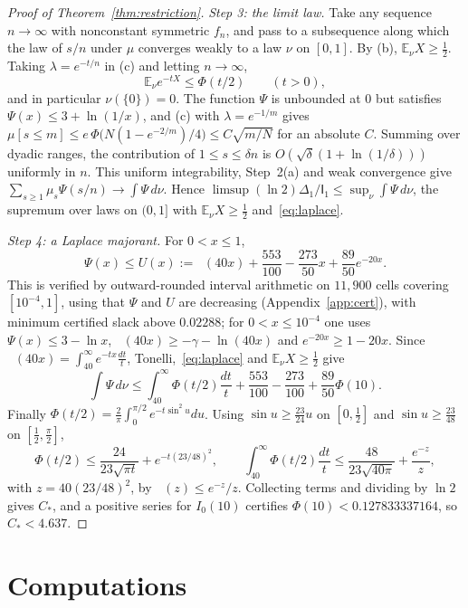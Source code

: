 \documentclass[11pt]{amsart}
\theoremstyle{definition}
\theoremstyle{remark}
\newcommand{\E}{\mathbb E}
\newcommand{\I}{\mathsf I}
\DeclareMathOperator{\Ei}{E_1}
\begin{document}
\begin{proof}[Proof of Theorem~\ref{thm:restriction}]
\emph{Step 3: the limit law.} Take any sequence $n\to\infty$ with nonconstant symmetric $f_n$, and pass to a subsequence along which the law of $s/n$ under $\mu$ converges weakly to a law $\nu$ on $[0,1]$. By (b), $\E_\nu X\ge\frac12$. Taking $\lambda=e^{-t/n}$ in (c) and letting $n\to\infty$,
\begin{equation}\label{eq:laplace}
 \E_\nu e^{-tX}\le\Phi(t/2)\qquad(t>0),
\end{equation}
and in particular $\nu(\{0\})=0$. The function $\Psi$ is unbounded at $0$ but satisfies $\Psi(x)\le3+\ln(1/x)$, and (c) with $\lambda=e^{-1/m}$ gives $\mu[s\le m]\le e\,\Phi\bigl(N(1-e^{-2/m})/4\bigr)\le C\sqrt{m/N}$ for an absolute $C$. Summing over dyadic ranges, the contribution of $1\le s\le\delta n$ is $O(\sqrt\delta(1+\ln(1/\delta)))$ uniformly in $n$. This uniform integrability, Step~2(a) and weak convergence give $\sum_{s\ge1}\mu_s\Psi(s/n)\to\int\Psi\,d\nu$. Hence $\limsup(\ln2)\Delta_1/\I_1\le\sup_\nu\int\Psi\,d\nu$, the supremum over laws on $(0,1]$ with $\E_\nu X\ge\frac12$ and~\eqref{eq:laplace}.

\emph{Step 4: a Laplace majorant.} For $0<x\le1$,
\begin{equation}\label{eq:majorant}
 \Psi(x)\le U(x):=\Ei(40x)+\frac{553}{100}-\frac{273}{50}x+\frac{89}{50}e^{-20x}.
\end{equation}
This is verified by outward-rounded interval arithmetic on $11{,}900$ cells covering $[10^{-4},1]$, using that $\Psi$ and $U$ are decreasing (Appendix~\ref{app:cert}), with minimum certified slack above $0.02288$; for $0<x\le10^{-4}$ one uses $\Psi(x)\le3-\ln x$, $\Ei(40x)\ge-\gamma-\ln(40x)$ and $e^{-20x}\ge1-20x$. Since $\Ei(40x)=\int_{40}^\infty e^{-tx}\frac{dt}t$, Tonelli,~\eqref{eq:laplace} and $\E_\nu X\ge\frac12$ give
\[
 \int\Psi\,d\nu\le\int_{40}^\infty\Phi(t/2)\frac{dt}t+\frac{553}{100}-\frac{273}{100}+\frac{89}{50}\Phi(10).
\]
Finally $\Phi(t/2)=\frac2\pi\int_0^{\pi/2}e^{-t\sin^2u}du$. Using $\sin u\ge\frac{23}{24}u$ on $[0,\frac12]$ and $\sin u\ge\frac{23}{48}$ on $[\frac12,\frac\pi2]$,
\[
 \Phi(t/2)\le\frac{24}{23\sqrt{\pi t}}+e^{-t(23/48)^2},\qquad
 \int_{40}^\infty\Phi(t/2)\frac{dt}t\le\frac{48}{23\sqrt{40\pi}}+\frac{e^{-z}}z,
\]
with $z=40(23/48)^2$, by $\Ei(z)\le e^{-z}/z$. Collecting terms and dividing by $\ln2$ gives $C_*$, and a positive series for $I_0(10)$ certifies $\Phi(10)<0.127833337164$, so $C_*<4.637$.
\end{proof}

\section{Computations}\label{sec:computations}
\end{document}
